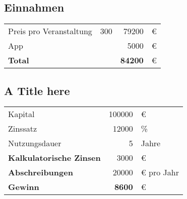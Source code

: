 \subsection{Einnahmen}

\begin{table}[H]

    \begin{tabular}{l r r l}
        Preis pro Veranstaltung & 300       & 79200 & €\\
        App                     &           & 5000  & €\\
        \midrule
        \textbf{Total}          &           & \textbf{84200}  & €
    \end{tabular}
    \label{tab:einnahmen}
\end{table}


\subsection{A Title here}

\begin{table}[H]

    \begin{tabular}{l r l}
        Kapital                 & 100000    & €\\
        Zinssatz                & 12000     & \%\\
        Nutzungsdauer           & 5         & Jahre\\
        \midrule
        \textbf{Kalkulatorische Zinsen} & 3000 & €\\
        \textbf{Abschreibungen} & 20000 & € pro Jahr\\
        \midrule
        \textbf{Gewinn}         & \textbf{8600}  & €
    \end{tabular}
    \label{tab:bla}
\end{table}


